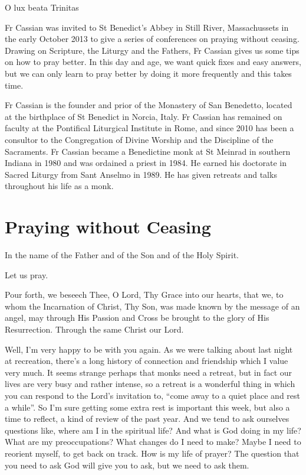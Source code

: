 \documentclass[10pt,a5paper]{book}
\begin{document}
O lux beata Trinitas

Fr Cassian was invited to St Benedict's Abbey in Still River, Massachussets in the early October 2013 to give a series of conferences on praying without ceasing. Drawing on Scripture, the Liturgy and the Fathers, Fr Cassian gives us some tips on how to pray better. In this day and age, we want quick fixes and easy answers, but we can only learn to pray better by doing it more frequently and this takes time.

Fr Cassian is the founder and prior of the Monastery of San Benedetto, located at the birthplace of St Benedict in Norcia, Italy. Fr Cassian has remained on faculty at the Pontifical Liturgical Institute in Rome, and since 2010 has been a consultor to the Congregation of Divine Worship and the Discipline of the Sacraments. Fr Cassian became a Benedictine monk at St Meinrad in southern Indiana in 1980 and was ordained a priest in 1984. He earned his doctorate in Sacred Liturgy from Sant Anselmo in 1989. He has given retreats and talks throughout his life as a monk.

\chapter{Praying without Ceasing}

In the name of the Father and of the Son and of the Holy Spirit.

Let us pray.

Pour forth, we beseech Thee, O Lord, Thy Grace into our hearts, that we, to whom the Incarnation of Christ, Thy Son, was made known by the message of an angel, may through His Passion and Cross be brought to the glory of His Resurrection. Through the same Christ our Lord.

Well, I'm very happy to be with you again. As we were talking about last night at recreation, there's a long history of connection and friendship which I value very much. It seems strange perhaps that monks need a retreat, but in fact our lives are very busy and rather intense, so a retreat is a wonderful thing in which you can respond to the Lord's invitation to, ``come away to a quiet place and rest a while''. So I'm sure getting some extra rest is important this week, but also a time to reflect, a kind of review of the past year. And we tend to ask ourselves questions like, where am I in the spiritual life? And what is God doing in my life? What are my preoccupations? What changes do I need to make? Maybe I need to reorient myself, to get back on track. How is my life of prayer? The question that you need to ask God will give you to ask, but we need to ask them.
\end{document}
